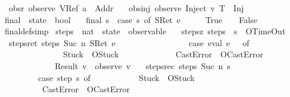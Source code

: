 \begin{isabellebody}
\ \ obsr{\isacharcolon}\ {\isachardoublequoteopen}observe\ {\isacharparenleft}VRef\ a{\isacharparenright}\ {\isacharequal}\ Addr{\isachardoublequoteclose}\ {\isacharbar}\isanewline
\ \ obsinj{\isacharcolon}\ {\isachardoublequoteopen}observe\ {\isacharparenleft}Inject\ v\ T{\isacharparenright}\ {\isacharequal}\ Inj{\isachardoublequoteclose}\isanewline
\isanewline
{}\isamarkupfalse \ final\ {\isacharcolon}{\isacharcolon}\ {\isachardoublequoteopen}state\ {\isasymRightarrow}\ bool{\isachardoublequoteclose}\ \isanewline
\ \ {\isachardoublequoteopen}final\ s\ {\isasymequiv}\ {\isacharparenleft}case\ s\ of\ {\isacharparenleft}SRet\ e{\isacharcomma}\ {\isasymrho}{\isacharcomma}\ {\isacharbrackleft}{\isacharbrackright}{\isacharcomma}\ {\isasymmu}{\isacharcomma}\ {\isacharbrackleft}{\isacharbrackright}{\isacharparenright}\ {\isasymRightarrow}\ True\ {\isacharbar}\ {\isacharunderscore}\ {\isasymRightarrow}\ False{\isacharparenright}{\isachardoublequoteclose}\isanewline
{}\isamarkupfalse \ final{\isacharunderscore}def{\isacharbrackleft}simp{\isacharbrackright}\isanewline
\isanewline
{}\isamarkupfalse \ steps\ {\isacharcolon}{\isacharcolon}\ {\isachardoublequoteopen}nat\ {\isasymRightarrow}\ state\ {\isasymRightarrow}\ observable{\isachardoublequoteclose}\ \isanewline
\ \ stepsz{\isacharcolon}\ {\isachardoublequoteopen}steps\ {}\ s\ {\isacharequal}\ OTimeOut{\isachardoublequoteclose}\ {\isacharbar}\isanewline
\ \ stepsret{\isacharcolon}\ {\isachardoublequoteopen}steps\ {\isacharparenleft}Suc\ n{\isacharparenright}\ {\isacharparenleft}SRet\ e{\isacharcomma}\ {\isasymrho}{\isacharcomma}\ {\isacharbrackleft}{\isacharbrackright}{\isacharcomma}\ {\isasymmu}{\isacharcomma}\ {\isacharbrackleft}{\isacharbrackright}{\isacharparenright}\ {\isacharequal}\isanewline
\ \ \ \ \ \ \ \ \ \ \ \ {\isacharparenleft}case\ eval\ e\ {\isasymrho}\ {\isasymmu}\ of\isanewline
\ \ \ \ \ \ \ \ \ \ \ \ \ \ \ Stuck\ {\isasymRightarrow}\ OStuck\isanewline
\ \ \ \ \ \ \ \ \ \ \ \ {\isacharbar}\ CastError\ {\isasymRightarrow}\ OCastError\isanewline
\ \ \ \ \ \ \ \ \ \ \ \ {\isacharbar}\ Result\ v\ {\isasymRightarrow}\ observe\ v{\isacharparenright}{\isachardoublequoteclose}\ {\isacharbar}\isanewline
\ \ stepsrec{\isacharcolon}\ {\isachardoublequoteopen}steps\ {\isacharparenleft}Suc\ n{\isacharparenright}\ s\ {\isacharequal}\isanewline
\ \ \ \ \ \ \ \ \ {\isacharparenleft}case\ step\ s\ of\isanewline
\ \ \ \ \ \ \ \ \ \ \ Stuck\ {\isasymRightarrow}\ OStuck\isanewline
\ \ \ \ \ \ \ \ \ {\isacharbar}\ CastError\ {\isasymRightarrow}\ OCastError\isanewline

\end{isabellebody}
